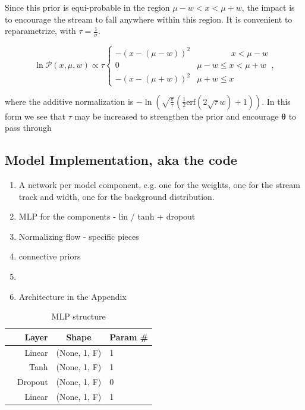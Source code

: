 \documentclass[twocolumn]{aastex631}
\newcommand{\mbs}[1]{\boldsymbol{#1}}
\newcommand{\mcal}[1]{\mathcal{#1}}
\newcommand{\pdf}{\mcal{P}}
\begin{document}
            Since this prior is equi-probable in the region $\mu - w < x < \mu + w$, the  impact is to encourage the stream to fall anywhere within this region. 
            It is convenient to reparametrize, with $\tau = \frac{1}{\sigma}$.
            \begin{small}
            \begin{equation}
                \ln \pdf(x,\mu,w) \propto \tau \begin{cases} 
                    -\left(x-(\mu-w)\right)^2 & \phantom{\mu - w <}\ x < \mu - w \\
                    0 & \mu - w \leq x < \mu + w \\
                    -\left(x-(\mu+w)\right)^2 & \mu + w \leq x
                \end{cases},
            \end{equation}\end{small}
            where the additive normalization is 
            $-\ln\left(\sqrt{\frac{\pi}{\tau}} \left(\frac{1}{2}\text{erf}\left(2 \sqrt{\tau } w\right)+1\right)\right)$. In this form we see that $\tau$ may be increased to strengthen the prior and encourage $\mbs{\theta}$ to pass through 


    \subsection{Model Implementation, aka the code} \label{sub:model_implementation}


        \begin{enumerate}
            \item A network per model component, e.g. one for the weights, one for the stream track and width, one for the background distribution.
            \item MLP for the components - lin / tanh + dropout
            \item Normalizing flow - specific pieces
            \item connective priors
            \item 
            \item Architecture in the Appendix
        \end{enumerate}


        \begin{table}
            \centering
            \caption{MLP structure}
            \begin{tabular}{@{}rrcl@{}}
            \toprule
            & Layer & Shape & Param \# \\
            \midrule
            & Linear & (None, 1, F) & 1  \\
            & Tanh & (None, 1, F) & 1  \\
            & Dropout & (None, 1, F) & 0  \\
            & Linear & (None, 1, F) & 1  \\
            \bottomrule
            \end{tabular}
        \end{table}
\end{document}
